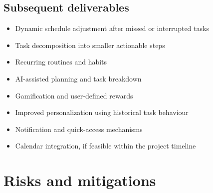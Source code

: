 \documentclass[11pt,a4paper]{article}
\begin{document}
\subsection{Subsequent deliverables}

\begin{itemize}[leftmargin=0.7cm]
    \item Dynamic schedule adjustment after missed or interrupted tasks
    \item Task decomposition into smaller actionable steps
    \item Recurring routines and habits
    \item AI-assisted planning and task breakdown
    \item Gamification and user-defined rewards
    \item Improved personalization using historical task behaviour
    \item Notification and quick-access mechanisms
    \item Calendar integration, if feasible within the project timeline
\end{itemize}

\section{Risks and mitigations}
\end{document}
